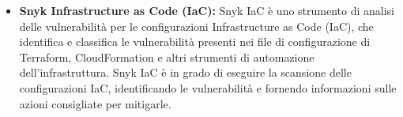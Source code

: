 \begin{itemize}
   \item \textbf{Snyk Infrastructure as Code (IaC):} Snyk IaC è uno strumento di analisi delle vulnerabilità per le configurazioni Infrastructure as Code (IaC), che identifica e classifica le vulnerabilità presenti nei file di configurazione di Terraform, CloudFormation e altri strumenti di automazione dell'infrastruttura. Snyk IaC è in grado di eseguire la scansione delle configurazioni IaC, identificando le vulnerabilità e fornendo informazioni  sulle azioni consigliate per mitigarle.

\end{itemize}
